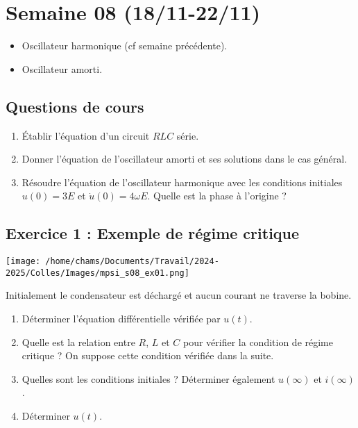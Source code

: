 \section{Semaine 08 (18/11-22/11) }


\begin{itemize}
	\item Oscillateur harmonique (cf semaine précédente).
	\item Oscillateur amorti.
\end{itemize}

\subsection{Questions de cours}

\begin{enumerate}
	\item Établir l'équation d'un circuit $RLC$ série.
	\item Donner l'équation de l'oscillateur amorti et ses solutions dans le cas général.
	\item Résoudre l'équation de l'oscillateur harmonique avec les conditions initiales $u(0)=3E$ et $\dot{u}(0)=4 \omega E$. Quelle est la phase à l'origine ?
\end{enumerate}

\subsection{Exercice 1 : Exemple de régime critique}

\begin{minipage}[c]{\linewidth/2}
	\texttt{[image: /home/chams/Documents/Travail/2024-2025/Colles/Images/mpsi\_s08\_ex01.png]}
\end{minipage}%
\begin{minipage}[c]{\linewidth/2}
	Initialement le condensateur est déchargé et aucun courant ne traverse la bobine.
\end{minipage}

\begin{enumerate}
	\item Déterminer l'équation différentielle vérifiée par $u(t)$.
	\item Quelle est la relation entre $R$, $L$ et $C$ pour vérifier la condition de régime critique ? On suppose cette condition vérifiée dans la suite.
	\item Quelles sont les conditions initiales ? Déterminer également $u(\infty)$ et $i(\infty)$.
	\item Déterminer $u(t)$.
\end{enumerate}

